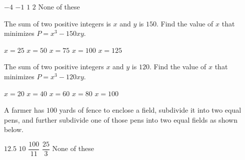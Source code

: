\begin{questions}
    \begin{oneparchoices}
        \choice $-4$
        \choice $-1$
        \choice $1$
        \choice $2$
        \choice None of these
    \end{oneparchoices} \par \horizontalline

    \question The sum of two positive integers is $x$ and $y$ is $150$. Find the value of $x$ that minimizes $P = x^3 - 150xy$. \\

    \begin{oneparchoices}
        \choice $x = 25$
        \choice $x = 50$
        \choice $x = 75$
        \choice $x = 100$
        \choice $x = 125$
    \end{oneparchoices} \par \horizontalline

    \question The sum of two positive integers $x$ and $y$ is $120$. Find the value of $x$ that minimizes $P = x^3 - 120xy$. \\

    \begin{oneparchoices}
        \choice $x = 20$
        \choice $x = 40$
        \choice $x = 60$
        \choice $x = 80$
        \choice $x = 100$
    \end{oneparchoices} \par \horizontalline

    \question A farmer has $100$ yards of fence to enclose a field, subdivide it into two equal pens, and further subdivide one of those pens into two equal fields as shown below. 
    \begin{center}
    \end{center} \vspace{11pt}

    \begin{oneparchoices}
        \choice $12.5$
        \choice $10$
        \choice $\dfrac{100}{11}$
        \choice $\dfrac{25}{3}$
        \choice None of these
    \end{oneparchoices} \par \horizontalline


\end{questions}
